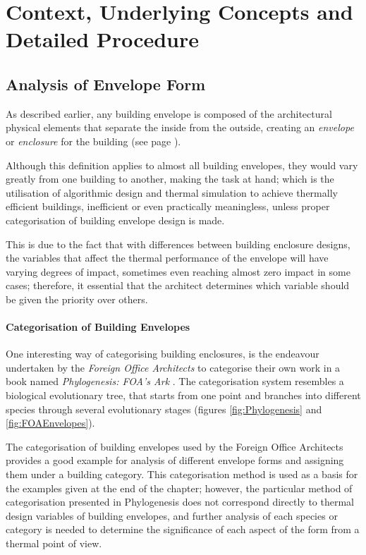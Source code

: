 \clearpage
\section{Context, Underlying Concepts and Detailed Procedure}
\label{sec:DetailedProcedure}

\subsection{Analysis of Envelope Form}
\label{sec:AnalyseEnvelope}

As described earlier, any building envelope is composed of the architectural physical elements that separate the inside from the outside, creating an \emph{envelope} or \emph{enclosure} for the building (see page \pageref{BuildEnvDef}).

Although this definition applies to almost all building envelopes, they would vary greatly from one building to another, making the task at hand; which is the utilisation of algorithmic design and thermal simulation to achieve thermally efficient buildings, inefficient or even practically meaningless, unless proper categorisation of building envelope design is made.

This is due to the fact that with differences between building enclosure designs, the variables that affect the thermal performance of the envelope will have varying degrees of impact, sometimes even reaching almost zero impact in some cases; therefore, it essential that the architect determines which variable should be given the priority over others.

\paragraph{Categorisation of Building Envelopes}\mbox{}

One interesting way of categorising building enclosures, is the endeavour undertaken by the \emph{Foreign Office Architects} to categorise their own work in a book named \emph{Phylogenesis: FOA's Ark} \cite{foa04}. The categorisation system resembles a biological evolutionary tree, that starts from one point and branches into different species through several evolutionary stages (figures \ref{fig:Phylogenesis} and \ref{fig:FOAEnvelopes}).

The categorisation of building envelopes used by the Foreign Office Architects provides a good example for analysis of different envelope forms and assigning them under a building category. This categorisation method is used as a basis for the examples given at the end of the chapter; however, the particular method of categorisation presented in Phylogenesis does not correspond directly to thermal design variables of building envelopes, and further analysis of each species or category is needed to determine the significance of each aspect of the form from a thermal point of view.

